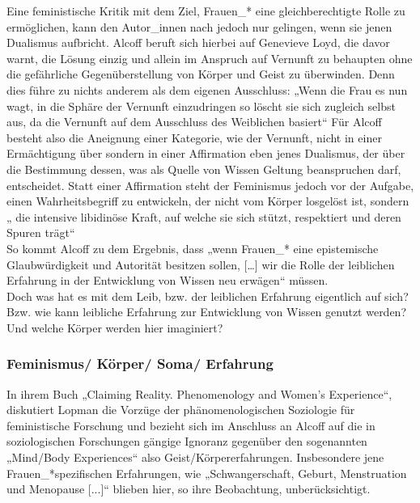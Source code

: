 \noindent Eine feministische Kritik mit
dem Ziel, Frauen\_* eine gleichberechtigte Rolle zu ermöglichen, kann den
Autor\_innen nach jedoch nur gelingen, wenn sie jenen Dualismus aufbricht.
Alcoff beruft sich hierbei auf Genevieve Loyd, die davor warnt, die Lösung
einzig und allein im Anspruch auf Vernunft zu behaupten ohne die gefährliche
Gegenüberstellung von Körper und Geist zu überwinden. Denn dies führe zu nichts
anderem als dem eigenen Ausschluss: „Wenn die Frau es nun wagt, in die Sphäre
der Vernunft einzudringen so löscht sie sich zugleich selbst aus, da die
Vernunft auf dem Ausschluss des Weiblichen basiert“\footnotemark
{} Für Alcoff besteht also
die Aneignung einer Kategorie, wie der Vernunft, nicht in einer Ermächtigung
über sondern in einer Affirmation eben jenes Dualismus, der über die Bestimmung
dessen, was als Quelle von Wissen Geltung beanspruchen darf, entscheidet. Statt
einer Affirmation steht der Feminismus jedoch vor der Aufgabe, einen
Wahrheitsbegriff zu entwickeln, der nicht vom Körper losgelöst ist, sondern
„
die intensive libidinöse Kraft, auf welche sie sich stützt, respektiert und
deren Spuren trägt“\footnotemark {}\\
So kommt Alcoff zu dem Ergebnis, dass „wenn Frauen\_* eine
epistemische Glaubwürdigkeit und Autorität besitzen sollen, […] wir die Rolle
der leiblichen Erfahrung in der Entwicklung von Wissen neu erwägen“\footnotemark {} müssen.\\
\noindent Doch was hat es mit dem Leib, bzw. der leiblichen Erfahrung eigentlich auf
sich? Bzw. wie kann leibliche Erfahrung zur Entwicklung von Wissen genutzt
werden? Und welche Körper werden hier imaginiert?

\subsubsection{Feminismus/ Körper/ Soma/ Erfahrung}

In ihrem Buch „Claiming Reality. Phenomenology and Women's Experience“,
diskutiert Lopman die Vorzüge der phänomenologischen Soziologie für
feministische Forschung und bezieht sich im Anschluss an Alcoff auf die in
soziologischen Forschungen gängige Ignoranz gegenüber den sogenannten
„Mind/Body Experiences“ also Geist/Körpererfahrungen. Insbesondere jene
Frauen\_*spezifischen Erfahrungen, wie „Schwangerschaft, Geburt, Menstruation
und Menopause [...]“\footnotemark {} blieben hier, so ihre Beobachtung, unberücksichtigt.\\

